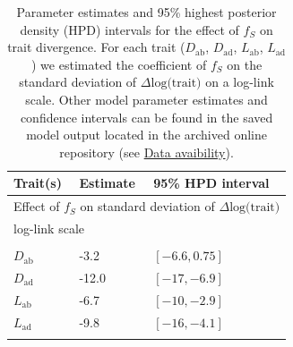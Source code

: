 \documentclass[
  12pt,
]{article}
\begin{document}
\begin{table}[ht]
\caption{\label{tab:h3output} Parameter estimates and 95\% highest posterior density (HPD) intervals for the effect of  $f_S$ on trait divergence. For each trait ($D_\mathrm{ab}$, $D_\mathrm{ad}$, $L_\mathrm{ab}$, $L_\mathrm{ad}$) we estimated the coefficient of $f_S$ on the standard deviation of $\Delta \text{log(trait)}$ on a log-link scale. Other model parameter estimates and confidence intervals can be found in the saved model output located in the archived online repository (see \protect\hyperlink{results}{Data avaibility}).}
\begin{center}
\begin{tabular}{lll}

  \toprule
  Trait(s) & Estimate & 95\% HPD interval \\
  \midrule
  
  \multicolumn{3}{l}{Effect of $f_S$ on standard deviation of $\Delta \text{log(trait)}$} \\
  \multicolumn{3}{l}{log-link scale} \\
  \\
  $D_\mathrm{ab}$ &  -3.2  & $[-6.6,0.75]$  \\
  $D_\mathrm{ad}$ & -12.0  & $[-17,-6.9]$  \\
  $L_\mathrm{ab}$ &  -6.7  & $[-10,-2.9]$  \\
  $L_\mathrm{ad}$ &  -9.8  & $[-16,-4.1]$  \\
  \\

\bottomrule

\end{tabular}
\end{center}
\end{table}
\end{document}
